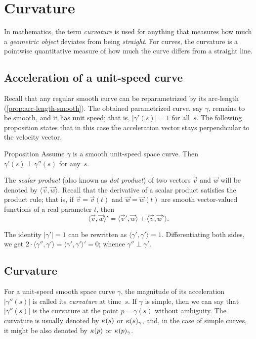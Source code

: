 \chapter{Curvature}
\label{chap:curve-curvature}

In mathematics, the term {}\emph{curvature} is used for anything that measures how much a {}\emph{geometric object} deviates from being {}\emph{straight}.
For curves, the curvature is a pointwise quantitative measure of how much the curve differs from a straight line.




\section{Acceleration of a unit-speed curve}

Recall that any regular smooth curve can be reparametrized by its arc-length (\ref{prop:arc-length-smooth}).
The obtained parametrized curve, say $\gamma$, remains to be smooth, and it has unit speed; 
that is, $|\gamma'(s)|=1$ for all~$s$.
The following proposition states that in this case
the acceleration vector stays perpendicular to the velocity vector.

\begin{thm}{Proposition}\label{prop:a'-pertp-a''}
Assume $\gamma$ is a smooth unit-speed space curve.
Then $\gamma'(s)\perp \gamma''(s)$ for any~$s$.
\end{thm}

The \emph{scalar product} (also known as \emph{dot product}) of two vectors $\vec v$ and $\vec w$ will be denoted by $\langle \vec v,\vec w\rangle$.
Recall that the derivative of a scalar product satisfies the product rule;
that is, if $\vec v=\vec v(t)$ and $\vec w=\vec w(t)$ are smooth vector-valued functions of a real parameter $t$, then
\[\langle \vec v,\vec w\rangle'=\langle \vec v',\vec w\rangle+\langle \vec v,\vec w'\rangle.\]

The identity $|\gamma'|=1$ can be rewritten as $\langle\gamma',\gamma'\rangle=1$.
Differentiating both sides, we get
$2\cdot\langle\gamma'',\gamma'\rangle=\langle\gamma',\gamma'\rangle'=0$;
whence $\gamma''\perp\gamma'$.
\qeds

\section{Curvature}\label{sec:curvature}

For a unit-speed smooth space curve $\gamma$, the magnitude of its acceleration $|\gamma''(s)|$ is called its \emph{curvature} at  time~$s$.
If $\gamma$ is simple, then we can say that $|\gamma''(s)|$ is the curvature at the point $p=\gamma(s)$ without ambiguity.
The curvature is usually denoted by $\kappa(s)$ or $\kappa(s)_\gamma$, and, in the case of simple curves, it might be also denoted by $\kappa(p)$ or $\kappa(p)_\gamma$.




